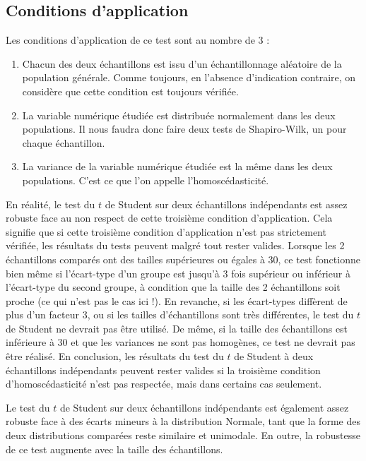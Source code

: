 \documentclass[
  french,
  a4paper,
  DIV=11,
  numbers=noendperiod,
  oneside]{scrreprt}
\providecommand{\tightlist}{%
  \setlength{\itemsep}{0pt}\setlength{\parskip}{0pt}}
\begin{document}
\subsection{Conditions d'application}\label{sec-robust}

Les conditions d'application de ce test sont au nombre de 3 :

\begin{enumerate}
\def\labelenumi{\arabic{enumi}.}
\tightlist
\item
  Chacun des deux échantillons est issu d'un échantillonnage aléatoire
  de la population générale. Comme toujours, en l'absence d'indication
  contraire, on considère que cette condition est toujours vérifiée.
\item
  La variable numérique étudiée est distribuée normalement dans les deux
  populations. Il nous faudra donc faire deux tests de Shapiro-Wilk, un
  pour chaque échantillon.
\item
  La variance de la variable numérique étudiée est la même dans les deux
  populations. C'est ce que l'on appelle l'homoscédasticité.
\end{enumerate}

En réalité, le test du \(t\) de Student sur deux échantillons
indépendants est assez robuste face au non respect de cette troisième
condition d'application. Cela signifie que si cette troisième condition
d'application n'est pas strictement vérifiée, les résultats du tests
peuvent malgré tout rester valides. Lorsque les 2 échantillons comparés
ont des tailles supérieures ou égales à 30, ce test fonctionne bien même
si l'écart-type d'un groupe est jusqu'à 3 fois supérieur ou inférieur à
l'écart-type du second groupe, à condition que la taille des 2
échantillons soit proche (ce qui n'est pas le cas ici !). En revanche,
si les écart-types diffèrent de plus d'un facteur 3, ou si les tailles
d'échantillons sont très différentes, le test du \(t\) de Student ne
devrait pas être utilisé. De même, si la taille des échantillons est
inférieure à 30 et que les variances ne sont pas homogènes, ce test ne
devrait pas être réalisé. En conclusion, les résultats du test du \(t\)
de Student à deux échantillons indépendants peuvent rester valides si la
troisième condition d'homoscédasticité n'est pas respectée, mais dans
certains cas seulement.

Le test du \(t\) de Student sur deux échantillons indépendants est
également assez robuste face à des écarts mineurs à la distribution
Normale, tant que la forme des deux distributions comparées reste
similaire et unimodale. En outre, la robustesse de ce test augmente avec
la taille des échantillons.
\end{document}
